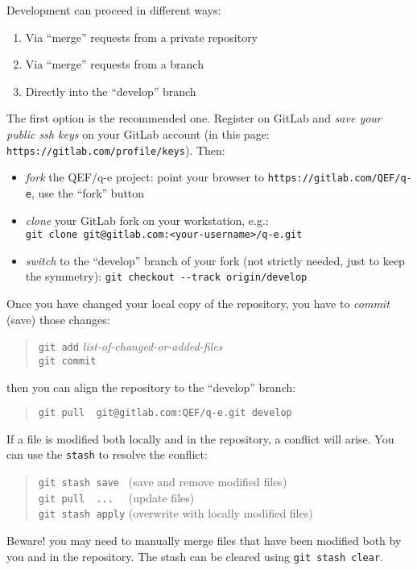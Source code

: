 \documentclass[12pt,a4paper]{article}
\begin{document}
Development can proceed in different ways:
\begin{enumerate}
\item Via ``merge'' requests from a private repository
\item Via ``merge'' requests from a branch
\item Directly into the ``develop'' branch
\end{enumerate}
The first option is the recommended one. Register on GitLab and {\em save
your public ssh keys} on your GitLab account (in this page:
\verb|https://gitlab.com/profile/keys|). Then:
\begin{itemize}
\item  {\em fork} the QEF/q-e project: point your browser to
	 \verb|https://gitlab.com/QEF/q-e|, use the ``fork'' button
\item {\em clone} your GitLab fork on your workstation, e.g.:\\
   \verb|git clone git@gitlab.com:<your-username>/q-e.git|
\item {\em switch} to the ``develop'' branch of your fork
   (not strictly needed, just to keep the symmetry):
   \verb|git checkout --track origin/develop|
\end{itemize}
Once you have changed your local copy of the repository,
you have to {\em commit} (save) those changes:
\begin{quote}
  \verb|git add| {\em list-of-changed-or-added-files}\\
  \verb|git commit |
\end{quote}
then you can align the repository to the ``develop'' branch:
\begin{quote}
  \verb|git pull  git@gitlab.com:QEF/q-e.git develop| 
\end{quote}
If a file is modified both locally and in the repository, a conflict
will arise. You can use the \texttt{stash} to resolve the conflict:
\begin{quote}
  \verb|git stash save | (save and remove modified files)\\
  \verb|git pull  ...  | (update files)\\
  \verb|git stash apply| (overwrite with locally modified files)
\end{quote}
Beware! you may need to manually merge files that have been modified both 
by you and in the repository.
The stash can be cleared using \texttt{git stash clear}.

\end{document}
